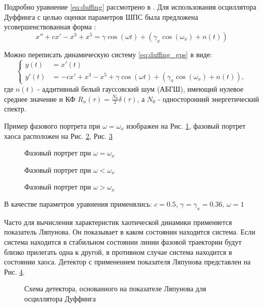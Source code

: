 Подробно уравнение \ref{eq:duffing} рассмотрено в \cite{chaos_neimark_landa}.
Для использования осциллятора Дуффинга с целью оценки параметров ШПС была предложена усовершенствованная форма \cite{chaos_song, chaos_chen}:
\begin{equation}
	\label{eq:duffing_gps}
	x'' +cx' - x^3 + x^5 = \gamma\cos(\omega{t}) + (\gamma_{x}\cos(\omega_{x}) + n(t))
\end{equation}

Можно переписать динамическую систему \ref{eq:duffing_gps} в виде:
\begin{equation}
	\label{eq:duffing_gps_2}
	\left\{
	\begin{aligned}
		y(t) & = x'(t) \\
		y'(t) & =  -cx' + x^3 - x^5 + \gamma\cos(\omega{t}) + (\gamma_{x}\cos(\omega_{x}) + n(t)),
	\end{aligned}
	\right.
\end{equation}
где ${n(t)}$ - аддитивный белый гауссовский шум (АБГШ), имеющий нулевое среднее  значение и КФ ${R_n(\tau) = \frac{N_0}{2} \delta(\tau)}$,
а ${N_0}$ - односторонний энергетический спектр.

Пример фазового портрета при ${\omega=\omega_{x}}$ изображен на Рис. \ref{pic:duffing_sync},
фазовый портрет хаоса расположен на Рис. \ref{pic:duffing_chaos1}, Рис. \ref{pic:duffing_chaos2}
\begin{figure}[h]
	\center{}
	\caption{Фазовый портрет при ${\omega =\omega_{x}}$}
	\label{pic:duffing_sync}
\end{figure}
\begin{figure}[h]
	\center{}
	\caption{Фазовый портрет при ${\omega < \omega_{x}}$}
	\label{pic:duffing_chaos1}
\end{figure}
\begin{figure}[h]
	\center{}
	\caption{Фазовый портрет при ${\omega > \omega_{x}}$}
	\label{pic:duffing_chaos2}
\end{figure}
В качестве параметров уравнения применялись: $c = 0.5$, $\gamma=\gamma_{x}=0.36$, ${\omega=1}$

Часто для вычисления характеристик хаотической динамики применяется показатель Ляпунова.
Он показывает в каком состоянии находится система. Если система находится
в стабильном состоянии линии фазовой траектории будут близко прилегать одна к другой, в противном
случае система находится в состоянии хаоса. Детектор с применением показателя Ляпунова
представлен на Рис. \ref{pic:chaos_lyapunov}.
\begin{figure}[h]
	\center{}
	\caption{Схема детектора, основанного на показателе Ляпунова для осциллятора Дуффинга}
	\label{pic:chaos_lyapunov}
\end{figure}

